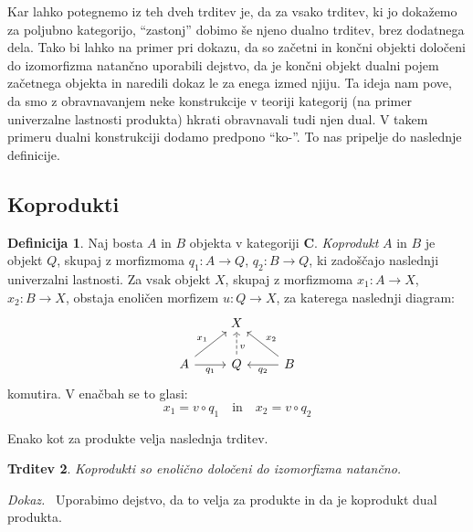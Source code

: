 \documentclass[12pt,a4paper]{book}
\theoremstyle{definition}
\newtheorem{definicija}{Definicija}[chapter]
\theoremstyle{plain}
\newtheorem{trditev}[definicija]{Trditev}
\newenvironment{dokaz}{\emph{Dokaz.}\ }{\hspace{\fill}{$\Box$}}
\theoremstyle{definition}
\theoremstyle{remark}
\newcommand{\cat}[1]{\textbf{#1}}
\begin{document}
Kar lahko potegnemo iz teh dveh trditev je, da za vsako trditev, ki jo dokažemo za poljubno kategorijo, "`zastonj"' dobimo še njeno dualno trditev, brez dodatnega dela. Tako bi lahko na primer pri dokazu, da so začetni in končni objekti določeni do izomorfizma natančno uporabili dejstvo, da je končni objekt dualni pojem začetnega objekta in naredili dokaz le za enega izmed njiju.
Ta ideja nam pove, da smo z obravnavanjem neke konstrukcije v teoriji kategorij (na primer univerzalne lastnosti produkta) hkrati obravnavali tudi njen dual. V takem primeru dualni konstrukciji dodamo predpono "`ko-"'. To nas pripelje do naslednje definicije.

\subsection{Koprodukti}
\begin{definicija}
Naj bosta $A$ in $B$ objekta v kategoriji $\cat{C}$. \emph{Koprodukt} $A$ in $B$ je objekt $Q$, skupaj z morfizmoma $q_1 : A \to Q$, $q_2 : B \to Q$, ki zadoščajo naslednji univerzalni lastnosti. Za vsak objekt $X$, skupaj z morfizmoma $x_1 : A \to X$, $x_2 : B \to X$, obstaja enoličen morfizem $u : Q \to X$, za katerega naslednji diagram:
%
$$\begin{tikzcd}
& X & \\
A \ar[ur, "x_1"] \ar[r, "q_1"'] & Q \ar[u, dashed, pos=0.35, "v"']  & B \ar[l, "q_2"] \ar[ul, "x_2"']
\end{tikzcd}$$
komutira. V enačbah se to glasi:
$$x_1 = v \circ q_1 \quad \text{in} \quad x_2 = v \circ q_2$$
\end{definicija}
Enako kot za produkte velja naslednja trditev.
\begin{trditev}
Koprodukti so enolično določeni do izomorfizma natančno.
\end{trditev}
\begin{dokaz}
Uporabimo dejstvo, da to velja za produkte in da je koprodukt dual produkta.
\end{dokaz}
\end{document}
